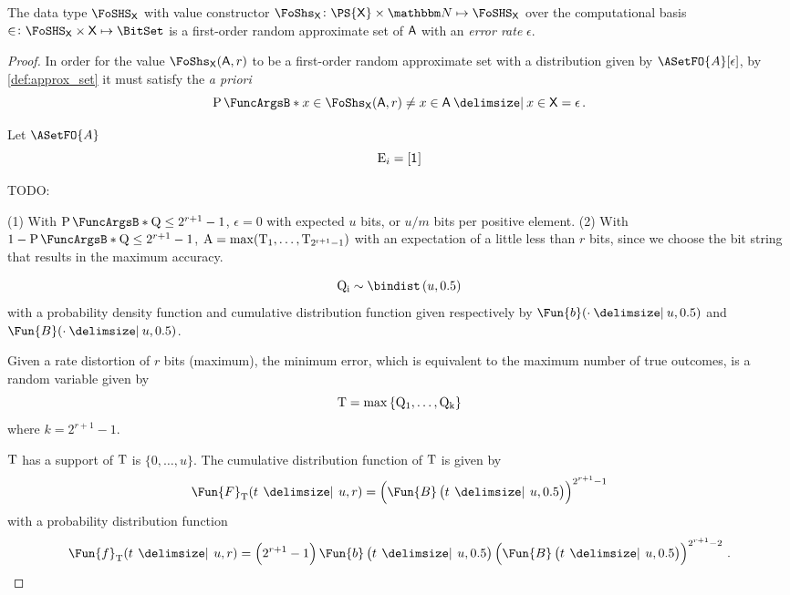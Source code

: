 \documentclass[ ../main.tex]{subfiles}
\begin{document}
\begin{theorem}
    The data type $\FoSHS_{\Set{X}}$ with value constructor $\FoShs_{\Set{X}} \colon \PS{\Set{X}} \times \NatSet \mapsto \FoSHS_{\Set{X}}$ over the computational basis $\SetContains \colon \FoSHS_{\Set{X}} \times \Set{X} \mapsto \BitSet$ is a first-order random approximate set of $\Set{A}$ with an \emph{error rate} $\epsilon$.
\end{theorem}
\begin{proof}
    In order for the value $\FoShs_{\Set{X}}(\Set{A},r)$ to be a first-order random approximate set with a distribution given by $\ASetFO{A}[\epsilon]$, by \cref{def:approx_set} it must satisfy the \emph{a priori}
    \begin{equation}
        \Prob{x \in \FoShs_{\Set{X}}(\Set{A},r) \neq x \in \Set{A} \Given x \in \Set{X}} = \epsilon\,.
    \end{equation}
    
    Let $\ASetFO{A}$
    \begin{equation}
        \RV{E}_i = [\SetIndicator{}]
    \end{equation}
    
    
    
    TODO:
    
    (1) With $\Prob{\RV{Q} \leq 2^{r+1}-1}$, $\epsilon = 0$ with expected $u$ bits, or $u/m$ bits per positive element.
    (2) With $1-\Prob{\RV{Q} \leq 2^{r+1}-1}$, $\mathrm{A} = \max(\mathrm{T_1},\ldots,\mathrm{T_{2^{r+1}-1}})$ with an expectation of a little less than $r$ bits, since we choose the bit string that results in the maximum accuracy.
    
    \begin{equation}
        \RV{Q_i} \sim \bindist\left(u, 0.5\right)
    \end{equation}
    with a probability density function and cumulative distribution function given respectively by
    $\Fun{b}(\cdot \Given u, 0.5)$ and $\Fun{B}(\cdot \Given u, 0.5)$.
    
    Given a rate distortion of $r$ bits (maximum), the minimum error, which is equivalent to the maximum number of true outcomes, is a random variable given by
    \begin{equation}
        \mathrm{T} = \max\left\{\mathrm{Q_1}, \ldots, \mathrm{Q_k}\right\}
    \end{equation}
    where $k = 2^{r+1}-1$.
    
    $\mathrm{T}$ has a support of $\mathrm{T}$ is $\{0,\ldots,u\}$.
    The cumulative distribution function of $\mathrm{T}$ is given by
    \begin{equation}
        \Fun{F}_{\RV{T}}(t \,\Given \,u, r) = \left(\Fun{B}\left(t \,\Given \, u, 0.5\right)\right)^{2^{r+1}-1}
    \end{equation}
    with a probability distribution function
    \begin{equation}
        \Fun{f}_{\RV{T}}(t \,\Given \,u, r) = \left(2^{r+1}-1\right) \Fun{b}
        \left(t \,\Given \, u, 0.5\right) \left(\Fun{B}
        \left(t \,\Given \, u, 0.5\right)\right)^{2^{r+1}-2}\,.
    \end{equation}
    

\end{proof}
\end{document}
